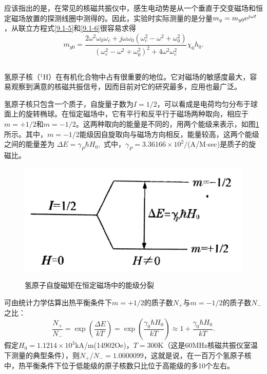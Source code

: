 \documentclass{buaaemp}
\begin{document}
应该指出的是，在常见的核磁共振仪中，感生电动势是从一个垂直于交变磁场和恒定磁场放置的探测线圈中测得的。因此，实验时实际测量的是分量$m_y=m_{y0}{\rm e}^{j\omega t}$，从联立方程式\ref{9.1-5}和\ref{9.1-6}很容易求得
\begin{equation}m_{y0}=\frac{2\omega^2\omega_0\omega_c+j\omega\omega_0(\omega_c^2-\omega^2+\omega_0^2)}{(\omega_c^2-\omega^2+\omega_0^2)^2+4\omega^2\omega_c^2}\chi_0h_0.\label{9.1-12}\end{equation}

\subsection{}
氢原子核（$^1$H）在有机化合物中占有很重要的地位。它对磁场的敏感度最大，容易观察到满意的核磁共振信号，因而目前对它的研究最多，应用也最广泛。

氢原子核只包含一个质子，自旋量子数为$I=1/2$，可以看成是电荷均匀分布于球面上的旋转椭球。在恒定磁场中，它有平行和反平行于磁场两种取向，相应于$m=+1/2$和$m=-1/2$。这两种取向的能量是不同的，用两个能级来表示，如图\ref{Fig2}所示。其中，$m=-1/2$能级因自旋取向与磁场方向相反，能量较高，这两个能级之间的能量差为
$\Delta E=\gamma_P\hbar H_0,$
式中，$\gamma_P=3.36166\times 10^2/$(A/M$\cdot$sec)是质子的旋磁比。

\begin{figure}[H]
\centering
\includegraphics[width = \linewidth]{image/2.png}\\
\caption{氢原子自旋磁矩在恒定磁场中的能级分裂}
\label{Fig2}
\end{figure}

可由统计力学估算出热平衡条件下$m=+1/2$的质子数$N_+$与$m=-1/2$的质子数$N_-$之比：
\begin{equation}\frac{N_+}{N_-}=\exp\left(\frac{\Delta E}{kT}\right)=\exp\left(\frac{\gamma_0\hbar H_0}{kT}\right)\approx 1+\frac{\gamma_0 \hbar H_0}{kT}.\label{9.1-13}\end{equation}
假定$H_0=1.1214\times 10^3$kA/m(14902Oe)，$T=300$K（这是60MHz核磁共振仪室温下测量的典型条件），则$N_+/N_-=1.0000099$，这就是说，在一百万个氢原子核中，热平衡条件下位于低能级的原子核数只比位于高能级的多10个左右。
\end{document}
